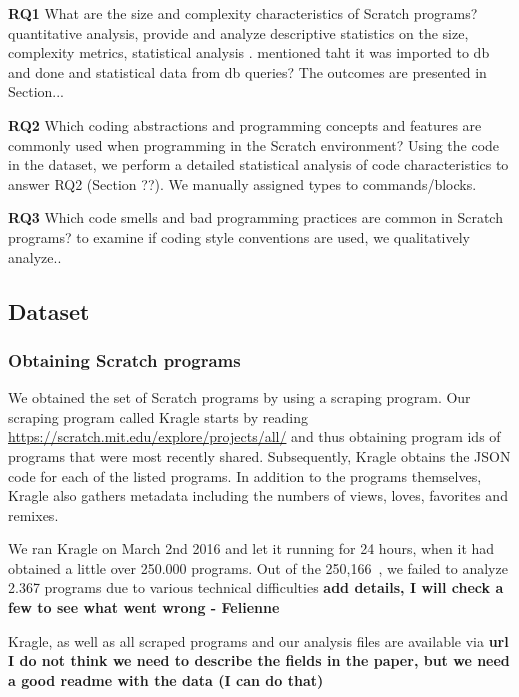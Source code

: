 \documentclass{sig-alternate}
\newcommand{\nPrograms}{250,166}
\newcommand{\todo}[1]{\textbf{#1}}
\begin{document}
\textbf{RQ1} What are the size and complexity characteristics of Scratch programs? quantitative analysis, provide and analyze descriptive statistics on the size, complexity metrics, statistical analysis . mentioned taht it was imported to db and done and statistical data from db queries? The outcomes are presented in Section...

\textbf{RQ2} Which coding abstractions and programming concepts and features are commonly used when programming in the Scratch environment? Using the code in the dataset, we perform a detailed statistical analysis of code characteristics to answer RQ2 (Section ??). We manually assigned types to commands/blocks.

\textbf{RQ3} Which code smells and bad programming practices are common in Scratch programs?  to examine if coding style conventions are used, we qualitatively analyze..

\subsection{Dataset}
\label{dataset}
\subsubsection{Obtaining Scratch programs}
We obtained the set of Scratch programs by using a scraping program. Our scraping program called Kragle starts by reading \url{https://scratch.mit.edu/explore/projects/all/} and thus obtaining program ids of programs that were most recently shared. Subsequently, Kragle obtains the JSON code for each of the listed programs. In addition to the programs themselves, Kragle also gathers metadata including the numbers of views, loves, favorites and remixes.


We ran Kragle on March 2nd 2016 and let it running for 24 hours, when it had obtained a little over 250.000 programs.  Out of the \nPrograms~, we failed to analyze 2.367 programs due to various technical difficulties \todo{add details, I will check a few to see what went wrong - Felienne} 

Kragle, as well as all scraped programs and our analysis files are available via \todo{url} \todo{I do not think we need to describe the fields in the paper, but we need a good readme with the data (I can do that)}
\end{document}
